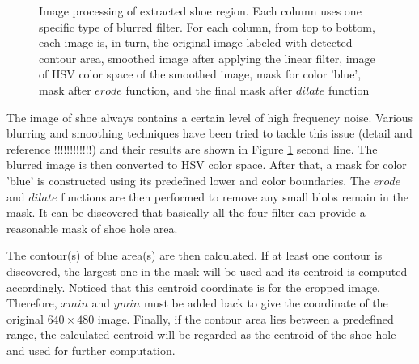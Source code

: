 \begin{figure}[H]
\caption{Image processing of extracted shoe region. Each column uses one specific type of blurred filter. For each column, from top to bottom, each image is, in turn, the original image labeled with detected contour area, smoothed image after applying the linear filter, image of HSV color space of the smoothed image, mask for color 'blue', mask after $erode$ function, and the final mask after $dilate$ function}
\label{filter}
\end{figure}

The image of shoe always contains a certain level of high frequency noise. Various blurring and smoothing techniques have been tried to tackle this issue (detail and reference !!!!!!!!!!!!) and their results are shown in Figure \ref{filter} second line. The blurred image is then converted to HSV color space. After that, a mask for color 'blue' is constructed using its predefined lower and color boundaries. The $erode$ and $dilate$ functions are then performed to remove any small blobs remain in the mask. It can be discovered that basically all the four filter can provide a reasonable mask of shoe hole area.

The contour(s) of blue area(s) are then calculated. If at least one contour is discovered, the largest one in the mask will be used and its centroid is computed accordingly. Noticed that this centroid coordinate is for the cropped image. Therefore, $xmin$ and $ymin$ must be added back to give the coordinate of the original $640 \times 480$ image. Finally, if the contour area lies between a predefined range, the calculated centroid will be regarded as the centroid of the shoe hole and used for further computation.

